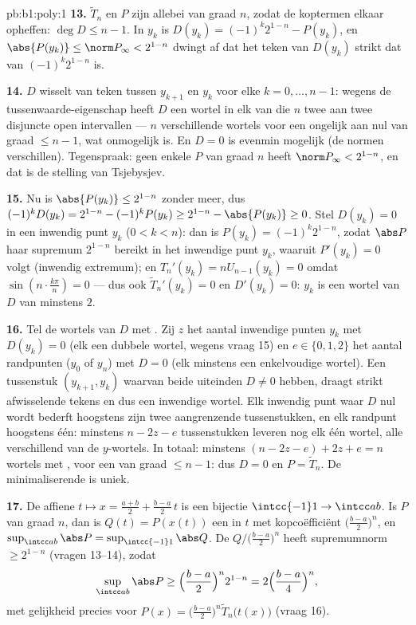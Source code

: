 \begin{solution}{pb:b1:poly:1}
\textbf{13.} $\widetilde T_n$ en $P$ zijn allebei  van graad $n$,
zodat de koptermen elkaar opheffen: $\deg D \leq n - 1$. In $y_k$ is
$D(y_k) = (-1)^k2^{1-n} - P(y_k)$, en $\abs{P(y_k)} \leq \norm P_\infty <
2^{1-n}$ dwingt af dat het teken van $D(y_k)$ strikt dat van
$(-1)^k2^{1-n}$ is.

\textbf{14.} $D$ wisselt van teken tussen $y_{k+1}$ en $y_k$ voor elke $k
= 0, \dots, n-1$: wegens de tussenwaarde-eigenschap heeft $D$ een wortel
in elk van die $n$ twee aan twee disjuncte open intervallen --- $n$
verschillende wortels voor een  ongelijk aan nul van graad $\leq n
- 1$, wat onmogelijk is. En $D = 0$ is evenmin mogelijk (de normen
verschillen). Tegenspraak: geen enkele  $P$ van graad $n$ heeft
$\norm P_\infty < 2^{1-n}$, en dat is de stelling van Tsjebysjev.

\textbf{15.} Nu is $\abs{P(y_k)} \leq 2^{1-n}$ zonder meer, dus
$(-1)^k D(y_k) = 2^{1-n} - (-1)^kP(y_k) \geq 2^{1-n} - \abs{P(y_k)} \geq
0$. Stel $D(y_k) = 0$ in een inwendig punt $y_k$ ($0 < k < n$): dan is
$P(y_k) = (-1)^k2^{1-n}$, zodat $\abs P$ haar supremum $2^{1-n}$ bereikt
in het inwendige punt $y_k$, waaruit $P'(y_k) = 0$ volgt (inwendig
extremum); en $T_n'(y_k) = nU_{n-1}(y_k) = 0$ omdat
$\sin(n\cdot\frac{k\pi}n) = 0$ --- dus ook $\widetilde T_n'(y_k) = 0$ en
$D'(y_k) = 0$: $y_k$ is een wortel van $D$ van  minstens
$2$.

\textbf{16.} Tel de wortels van $D$ met . Zij $z$ het
aantal inwendige punten $y_k$ met $D(y_k) = 0$ (elk een dubbele wortel,
wegens vraag 15) en $e \in \{0, 1, 2\}$ het aantal randpunten ($y_0$ of
$y_n$) met $D = 0$ (elk minstens een enkelvoudige wortel). Een tussenstuk
$(y_{k+1}, y_k)$ waarvan beide uiteinden $D \neq 0$ hebben, draagt strikt
afwisselende tekens en dus een inwendige wortel. Elk inwendig punt waar
$D$ nul wordt bederft hoogstens zijn twee aangrenzende tussenstukken, en
elk randpunt hoogstens één: minstens $n - 2z - e$ tussenstukken leveren
nog elk één wortel, alle verschillend van de $y$-wortels. In totaal:
minstens $(n - 2z - e) + 2z + e = n$ wortels met , voor een
 van graad $\leq n - 1$: dus $D = 0$ en $P = \widetilde T_n$. De
minimaliserende  is uniek.

\textbf{17.} De affiene  $t \mapsto x = \frac{a+b}2 +
\frac{b-a}2\,t$ is een bijectie $\intcc{-1}1 \to \intcc ab$. Is $P$
 van graad $n$, dan is $Q(t) = P(x(t))$ een  in $t$ met
kopcoëfficiënt $\bigl(\frac{b-a}2\bigr)^n$, en $\sup_{\intcc ab}\abs P =
\sup_{\intcc{-1}1}\abs Q$. De 
$Q/\bigl(\frac{b-a}2\bigr)^n$ heeft supremumnorm $\geq 2^{1-n}$ (vragen
13--14), zodat
\[
\sup_{\intcc ab}\abs P \geq \Bigl(\frac{b-a}2\Bigr)^n 2^{1-n}
= 2\Bigl(\frac{b-a}4\Bigr)^n ,
\]
met gelijkheid precies voor $P(x) = \bigl(\frac{b-a}2\bigr)^n \widetilde
T_n\bigl(t(x)\bigr)$ (vraag 16).


\end{solution}
